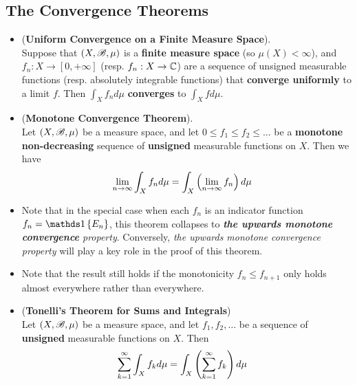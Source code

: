 \documentclass[11pt]{article}
\begin{document}
\subsection{The Convergence Theorems}
\begin{itemize}
\item \begin{proposition} (\textbf{Uniform Convergence on a Finite Measure Space}). \citep{tao2011introduction}\\
Suppose that $(X, {\mathscr B}, \mu)$ is a \textbf{finite measure space} (so $\mu(X) < \infty$), and $f_n: X \rightarrow [0, +\infty]$ (resp. $f_n: X \rightarrow {\mathbb C}$) are a sequence of unsigned measurable functions (resp. absolutely integrable functions) that \textbf{converge uniformly} to a limit $f$. Then $\int_X f_n d\mu$ \textbf{converges} to $\int_X f d\mu$.
\end{proposition}


\item \begin{theorem}(\textbf{Monotone Convergence Theorem}). \citep{tao2011introduction} \\
Let $(X, {\mathscr B}, \mu)$ be a measure space, and let $0 \le f_1 \le  f_2 \le \ldots $ be a \textbf{monotone non-decreasing} sequence of \textbf{unsigned} measurable functions on $X$. Then we have
\begin{align*}
\lim\limits_{n\rightarrow \infty}\int_{X}f_{n} d\mu &= \int_{X}\left(\lim\limits_{n\rightarrow \infty} f_{n}\right) d\mu 
\end{align*}
\end{theorem}

\item \begin{remark}
Note that in the special case when each $f_n$ is an indicator function $f_n = \ind{E_n}$, this theorem collapses to \emph{\textbf{the upwards monotone convergence} property}. Conversely, \emph{the upwards monotone convergence property} will play a key role in the proof of this theorem.
\end{remark}

\item \begin{remark}
 Note that  the result still holds if the monotonicity $f_n \le f_{n+1}$ only holds almost everywhere rather than everywhere.
 \end{remark}
 
\item \begin{corollary}(\textbf{Tonelli's Theorem for Sums and Integrals})\\
Let $(X, {\mathscr B}, \mu)$ be a measure space, and let $f_1, f_2, \ldots $ be a sequence of \textbf{unsigned} measurable functions on $X$. Then 
\begin{align*}
\sum_{k=1}^{\infty}\int_{X}f_{k} d\mu &= \int_{X}\left(\sum_{k=1}^{\infty}f_{k}\right) d\mu 
\end{align*}
\end{corollary}


\end{itemize}
\end{document}
